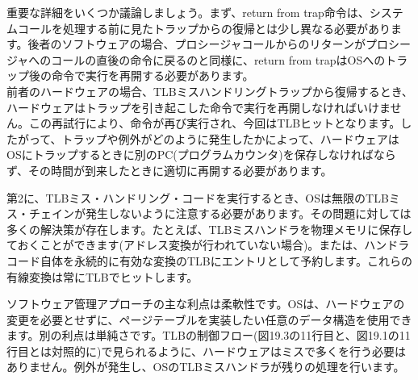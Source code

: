 重要な詳細をいくつか議論しましょう。まず、return from
trap命令は、システムコールを処理する前に見たトラップからの復帰とは少し異なる必要があります。後者のソフトウェアの場合、プロシージャコールからのリターンがプロシージャへのコールの直後の命令に戻るのと同様に、return
from trapはOSへのトラップ後の命令で実行を再開する必要があります。\\
前者のハードウェアの場合、TLBミスハンドリングトラップから復帰するとき、ハードウェアはトラップを引き起こした命令で実行を再開しなければいけません。この再試行により、命令が再び実行され、今回はTLBヒットとなります。したがって、トラップや例外がどのように発生したかによって、ハードウェアはOSにトラップするときに別のPC(プログラムカウンタ)を保存しなければならず、その時間が到来したときに適切に再開する必要があります。

第2に、TLBミス・ハンドリング・コードを実行するとき、OSは無限のTLBミス・チェインが発生しないように注意する必要があります。その問題に対しては多くの解決策が存在します。たとえば、TLBミスハンドラを物理メモリに保存しておくことができます(アドレス変換が行われていない場合)。または、ハンドラコード自体を永続的に有効な変換のTLBにエントリとして予約します。これらの有線変換は常にTLBでヒットします。

ソフトウェア管理アプローチの主な利点は柔軟性です。OSは、ハードウェアの変更を必要とせずに、ページテーブルを実装したい任意のデータ構造を使用できます。別の利点は単純さです。TLBの制御フロー(図19.3の11行目と、図19.1の11行目とは対照的に)で見られるように、ハードウェアはミスで多くを行う必要はありません。例外が発生し、OSのTLBミスハンドラが残りの処理を行います。

